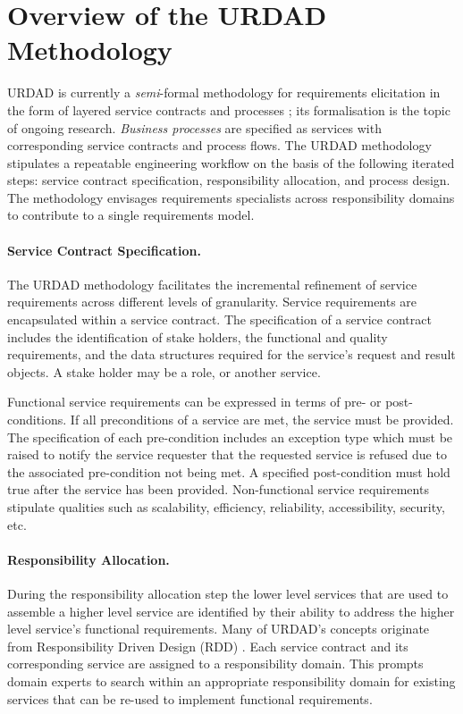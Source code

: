 \section{Overview of the URDAD Methodology 
\label{sec:urdadMethodology}}

URDAD is currently a \emph{semi}-formal methodology for requirements elicitation in the form of layered service contracts and processes  \cite{solms_urdad_2010}; its formalisation is the topic of ongoing research. \emph{Business processes} are specified as services with corresponding service contracts and process flows. The URDAD methodology stipulates a repeatable engineering workflow on the basis of the following iterated steps: service contract specification, responsibility allocation, and process design. The methodology envisages requirements specialists across responsibility domains to contribute to a single requirements model.

\paragraph{Service Contract Specification.} The URDAD methodology facilitates the incremental refinement of service requirements across different levels of granularity. Service requirements are encapsulated within a service contract. The specification of a service contract includes the identification of stake holders, the functional and quality requirements, and the data structures required for the service's request and result objects. A stake holder may be a role, or another service.

Functional service requirements can be expressed in terms of pre- or post-conditions. If all preconditions of a service are met, the service must be provided. The specification of each pre-condition includes an exception type which must be raised to notify the service requester that the requested service is refused due to the associated pre-condition not being met. A specified post-condition must hold true after the service has been provided. Non-functional service requirements stipulate qualities such as scalability, efficiency, reliability, accessibility, security, etc.

\paragraph{Responsibility Allocation.} During the responsibility allocation step the lower level services that are used to assemble a higher level service are identified by their ability to address the higher level service's functional requirements. Many of URDAD's concepts originate from Responsibility Driven Design (RDD) \cite{wirfs-brock_object-oriented_1989,wirfs-brock_object_2002}. Each service contract and its corresponding service are assigned to a responsibility domain. This prompts domain experts to search within an appropriate responsibility domain for existing services that can be re-used to implement functional requirements.

